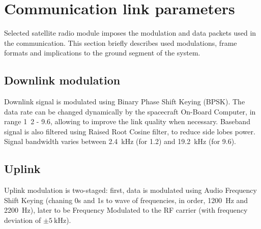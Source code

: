 





\section{Communication link parameters}
Selected satellite radio module imposes the modulation and data packets used in the communication. This section briefly describes used modulations, frame formats and implications to the ground segment of the system.

\subsection{Downlink modulation}
Downlink signal is modulated using Binary Phase Shift Keying (BPSK). The data rate can be changed dynamically by the spacecraft On-Board Computer, in range \si{1.2} - \SI{9.6}{\kbps}, allowing to improve the link quality when necessary. Baseband signal is also filtered using Raised Root Cosine filter, to reduce side lobes power. Signal bandwidth varies between \SI{2.4}{\kHz} (for \SI{1.2}{\kbps}) and \SI{19.2}{\kHz} (for \SI{9.6}{\kbps}).


\subsection{Uplink}
Uplink modulation is two-staged: first, data is modulated using Audio Frequency Shift Keying (chaning 0s and 1s to wave of frequencies, in order, \SI{1200}{\hertz} and \SI{2200}{\hertz}), later to be Frequency Modulated to the RF carrier (with frequency deviation of $\pm\SI{5}{\kilo\hertz}$).


